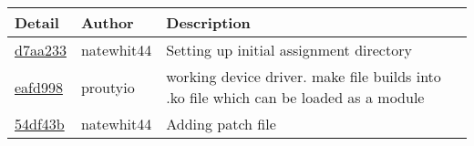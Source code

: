 \begin{tabular}{|l | l | l| }\hline\textbf{Detail} & \textbf{Author} & \textbf{Description}\\\hline
\href{https://github.com/proutyio/OSU_CS444/commit/d7aa233de30d70a02c4a6138133fcd7c6f68e32e}{d7aa233} & natewhit44 & Setting up initial assignment directory\\\hline
\href{https://github.com/proutyio/OSU_CS444/commit/eafd998a3cbcfbc5f46070d1927fc1b74aceb048}{eafd998} & proutyio & working device driver. make file builds into .ko file which can be loaded as a module\\\hline
\href{https://github.com/proutyio/OSU_CS444/commit/54df43b98a78c29330913dc46c367e3235c8aacd}{54df43b} & natewhit44 & Adding patch file\\\hline\end{tabular}

